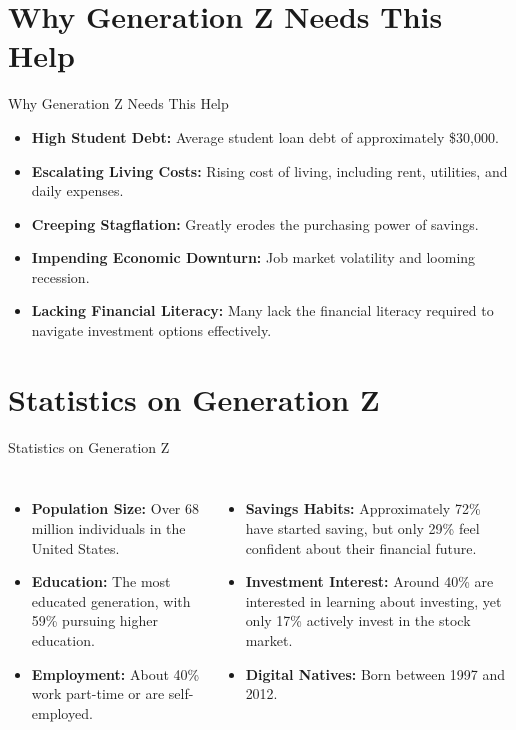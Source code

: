 \documentclass{beamer}
\begin{document}
\section{Why Generation Z Needs This Help}
\begin{frame}{Why Generation Z Needs This Help}
    \begin{itemize}
        \item \textbf{High Student Debt:} Average student loan debt of approximately \$30,000.
        \item \textbf{Escalating Living Costs:} Rising cost of living, including rent, utilities, and daily expenses.
        \item \textbf{Creeping Stagflation:} Greatly erodes the purchasing power of savings.
        \item \textbf{Impending Economic Downturn:} Job market volatility and looming recession.
        \item \textbf{Lacking Financial Literacy:} Many lack the financial literacy required to navigate investment options effectively.
    \end{itemize}
\end{frame}

\section{Statistics on Generation Z}
\begin{frame}{Statistics on Generation Z}
    \begin{columns}
        \begin{itemize}
            \item \textbf{Population Size:} Over 68 million individuals in the United States.
            \item \textbf{Education:} The most educated generation, with 59\% pursuing higher education.
            \item \textbf{Employment:} About 40\% work part-time or are self-employed.
        \end{itemize}
        \begin{itemize}
            \item \textbf{Savings Habits:} Approximately 72\% have started saving, but only 29\% feel confident about their financial future.
            \item \textbf{Investment Interest:} Around 40\% are interested in learning about investing, yet only 17\% actively invest in the stock market.
            \item \textbf{Digital Natives:} Born between 1997 and 2012.
        \end{itemize}
    \end{columns}
\end{frame}
\end{document}
